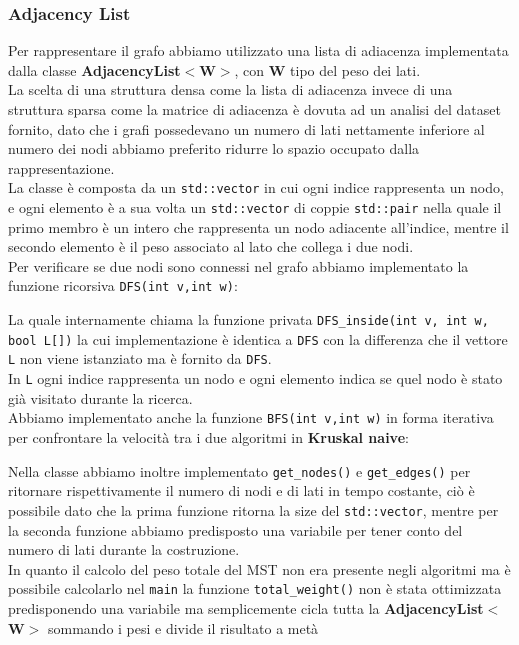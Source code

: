 \documentclass[]{article}
\begin{document}
\subsubsection{Adjacency List}
\begin{flushleft}
Per rappresentare il grafo abbiamo utilizzato una lista di adiacenza implementata dalla classe \textbf{AdjacencyList$<$W$>$}, con \textbf{W} tipo del peso dei lati.\\
La scelta di una struttura densa come la lista di adiacenza invece di una struttura sparsa come la matrice di adiacenza è dovuta ad un analisi del dataset fornito, dato che i grafi possedevano un numero di lati nettamente inferiore al numero dei nodi abbiamo preferito ridurre lo spazio occupato dalla rappresentazione.\\
La classe è composta da un \verb|std::vector| in cui ogni indice rappresenta un nodo, e ogni elemento è a sua volta un \verb|std::vector| di coppie \verb|std::pair| nella quale il primo membro è un intero che rappresenta un nodo adiacente all'indice, mentre il secondo elemento è il peso associato al lato che collega i due nodi.\\

Per verificare se due nodi sono connessi nel grafo abbiamo implementato la funzione ricorsiva \verb|DFS(int v,int w)|:
\lstset{language=c++, style=mystyle}

La quale internamente chiama la funzione privata \verb|DFS_inside(int v, int w, bool L[])| la cui implementazione è identica a \verb|DFS| con la differenza che il vettore \verb|L| non viene istanziato ma è fornito da \verb|DFS|.\\
In \verb|L| ogni indice rappresenta un nodo e ogni elemento indica se quel nodo è stato già visitato durante la ricerca.\\
Abbiamo implementato anche la funzione \verb|BFS(int v,int w)| in forma iterativa per confrontare la velocità tra i due algoritmi in \textbf{Kruskal naive}:
\lstset{language=c++, style=mystyle}

\end{flushleft}
Nella classe abbiamo inoltre implementato  \verb|get_nodes()| e \verb|get_edges()| per ritornare rispettivamente il numero di nodi e di lati in tempo costante, ciò è possibile dato che la prima funzione ritorna la size del \verb|std::vector|, mentre per la seconda funzione abbiamo predisposto una variabile per tener conto del numero di lati durante la costruzione.\\
In quanto il calcolo del peso totale del MST non era presente negli algoritmi ma è possibile calcolarlo nel \verb|main| la funzione \verb|total_weight()| non è stata ottimizzata predisponendo una variabile ma semplicemente cicla tutta la \textbf{AdjacencyList$<$W$>$} sommando i pesi e divide il risultato a metà
\lstset{language=c++, style=mystyle}

\newpage
\end{document}
